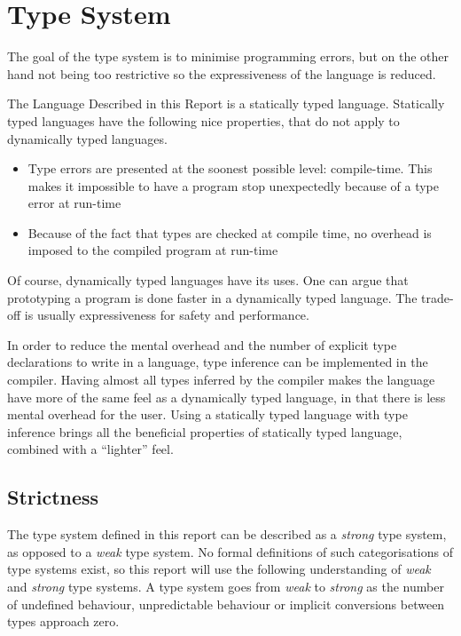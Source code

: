 \section{Type System}

The goal of the type system is to minimise programming errors, but on the other hand not being too restrictive so the expressiveness of the language is reduced. 

The Language Described in this Report is a statically typed language. Statically typed languages have the following nice properties, that do not apply to dynamically typed languages.

\begin{itemize}
  \item Type errors are presented at the soonest possible level: compile-time. This makes it impossible to have a program stop unexpectedly because of a type error at run-time
  \item Because of the fact that types are checked at compile time, no overhead is imposed to the compiled program at run-time
\end{itemize}

Of course, dynamically typed languages have its uses. One can argue that prototyping a program is done faster in a dynamically typed language. The trade-off is usually expressiveness for safety and performance.

In order to reduce the mental overhead and the number of explicit type declarations to write in a language, type inference can be implemented in the compiler. Having almost all types inferred by the compiler makes the language have more of the same feel as a dynamically typed language, in that there is less mental overhead for the user. Using a statically typed language with type inference brings all the beneficial properties of statically typed language, combined with a \enquote{lighter} feel.

\subsection{Strictness}

The type system defined in this report can be described as a \emph{strong} type system, as opposed to a \emph{weak} type system. No formal definitions of such categorisations of type systems exist, so this report will use the following understanding of \emph{weak} and \emph{strong} type systems. A type system goes from \emph{weak} to \emph{strong} as the number of undefined behaviour, unpredictable behaviour or implicit conversions between types approach zero.

